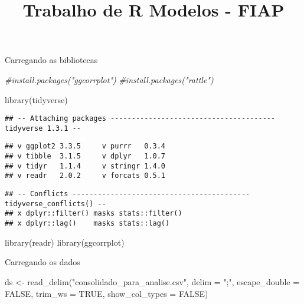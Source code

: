 \documentclass[
]{article}
\title{Trabalho de R Modelos - FIAP}
\author{}
\date{\vspace{-2.5em}}
\newenvironment{Shaded}{\begin{snugshade}}{\end{snugshade}}
\newcommand{\AttributeTok}[1]{\textcolor[rgb]{0.77,0.63,0.00}{#1}}
\newcommand{\CommentTok}[1]{\textcolor[rgb]{0.56,0.35,0.01}{\textit{#1}}}
\newcommand{\ConstantTok}[1]{\textcolor[rgb]{0.00,0.00,0.00}{#1}}
\newcommand{\FunctionTok}[1]{\textcolor[rgb]{0.00,0.00,0.00}{#1}}
\newcommand{\NormalTok}[1]{#1}
\newcommand{\OtherTok}[1]{\textcolor[rgb]{0.56,0.35,0.01}{#1}}
\newcommand{\StringTok}[1]{\textcolor[rgb]{0.31,0.60,0.02}{#1}}
\begin{document}
\maketitle

Carregando as bibliotecas

\begin{Shaded}
\begin{Highlighting}[]
\CommentTok{\#install.packages("ggcorrplot")}
\CommentTok{\#install.packages("rattle")}

\FunctionTok{library}\NormalTok{(tidyverse)}
\end{Highlighting}
\end{Shaded}

\begin{verbatim}
## -- Attaching packages --------------------------------------- tidyverse 1.3.1 --
\end{verbatim}

\begin{verbatim}
## v ggplot2 3.3.5     v purrr   0.3.4
## v tibble  3.1.5     v dplyr   1.0.7
## v tidyr   1.1.4     v stringr 1.4.0
## v readr   2.0.2     v forcats 0.5.1
\end{verbatim}

\begin{verbatim}
## -- Conflicts ------------------------------------------ tidyverse_conflicts() --
## x dplyr::filter() masks stats::filter()
## x dplyr::lag()    masks stats::lag()
\end{verbatim}

\begin{Shaded}
\begin{Highlighting}[]
\FunctionTok{library}\NormalTok{(readr)}
\FunctionTok{library}\NormalTok{(ggcorrplot)}
\end{Highlighting}
\end{Shaded}

Carregando os dados

\begin{Shaded}
\begin{Highlighting}[]
\NormalTok{ds }\OtherTok{\textless{}{-}} \FunctionTok{read\_delim}\NormalTok{(}\StringTok{"consolidado\_para\_analise.csv"}\NormalTok{, }
    \AttributeTok{delim =} \StringTok{";"}\NormalTok{, }\AttributeTok{escape\_double =} \ConstantTok{FALSE}\NormalTok{, }\AttributeTok{trim\_ws =} \ConstantTok{TRUE}\NormalTok{, }\AttributeTok{show\_col\_types =} \ConstantTok{FALSE}\NormalTok{)}
\end{Highlighting}
\end{Shaded}
\end{document}
